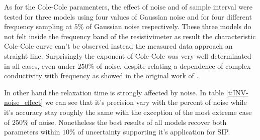 \documentclass{vie16}
\begin{document}
As for the Cole-Cole paramenters, the effect of noise and of sample interval were tested for three models using four values of Gaussian noise and for four different frequency sampling at $5\%$ of Gaussian noise respectively. These three models do not felt inside the frequency band of the resistivimeter as result the characteristic Cole-Cole curve can't be observed instead the measured data approach an straight line. Surprisingly the exponent of Cole-Cole  was very well determinated in all cases, even under $250\%$ of noise, despite relating a dependence of complex conductivity with frequency as showed in the original work of \citet{cole41}.

In other hand the relaxation time is strongly affected by noise. In table \ref{t:INV-noise_effect} we can see that it's precision vary with the 
percent of noise while it's accuracy stay roughly the same with the exception of the most extreme case of $250\%$ of noise. Nonetheless the best 
results of all models recover both parameters within $10\%$ of uncertainty supporting it's application for SIP.
\end{document}
